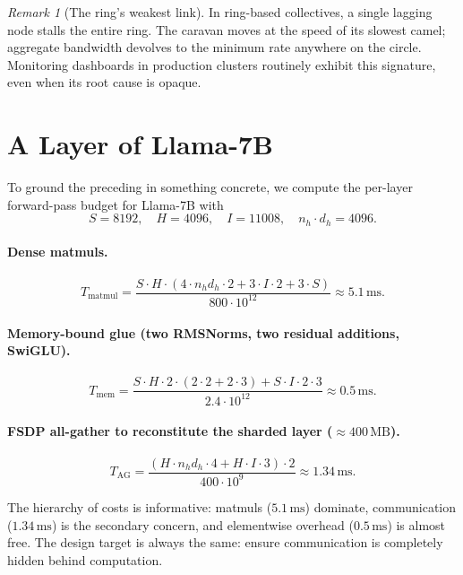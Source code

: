 \documentclass[11pt,a4paper]{article}
\theoremstyle{definition}
\theoremstyle{remark}
\newtheorem{remark}[definition]{Remark}
\theoremstyle{plain}
\newcommand{\MB}{\,\text{MB}}
\newcommand{\ms}{\,\text{ms}}
\begin{document}
\begin{remark}[The ring's weakest link]
In ring-based collectives, a single lagging node stalls the entire ring. The caravan moves at the speed of its slowest camel; aggregate bandwidth devolves to the minimum rate anywhere on the circle. Monitoring dashboards in production clusters routinely exhibit this signature, even when its root cause is opaque.
\end{remark}

\section{A Layer of Llama-7B}
\label{sec:llama}

To ground the preceding in something concrete, we compute the per-layer forward-pass budget for Llama-7B with
\[
S = 8192,\quad H = 4096,\quad I = 11008,\quad n_h \cdot d_h = 4096.
\]

\paragraph{Dense matmuls.}
\begin{equation}
T_{\text{matmul}} = \frac{S \cdot H \cdot (4 \cdot n_h d_h \cdot 2 + 3 \cdot I \cdot 2 + 3 \cdot S)}{800 \cdot 10^{12}} \approx 5.1\ms.
\end{equation}

\paragraph{Memory-bound glue (two RMSNorms, two residual additions, SwiGLU).}
\begin{equation}
T_{\text{mem}} = \frac{S \cdot H \cdot 2 \cdot (2 \cdot 2 + 2 \cdot 3) + S \cdot I \cdot 2 \cdot 3}{2.4 \cdot 10^{12}} \approx 0.5\ms.
\end{equation}

\paragraph{FSDP all-gather to reconstitute the sharded layer ($\approx 400\MB$).}
\begin{equation}
T_{\text{AG}} = \frac{(H \cdot n_h d_h \cdot 4 + H \cdot I \cdot 3) \cdot 2}{400 \cdot 10^{9}} \approx 1.34\ms.
\end{equation}

The hierarchy of costs is informative: matmuls ($5.1\ms$) dominate, communication ($1.34\ms$) is the secondary concern, and elementwise overhead ($0.5\ms$) is almost free. The design target is always the same: ensure communication is completely hidden behind computation.
\end{document}
